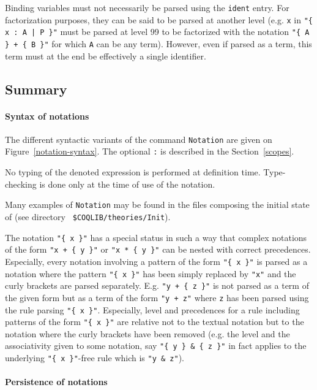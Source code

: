 \Rem Binding variables must not necessarily be parsed using the
{\tt ident} entry. For factorization purposes, they can be said to be
parsed at another level (e.g. {\tt x} in \verb="{ x : A | P }"= must be
parsed at level 99 to be factorized with the notation
\verb="{ A } + { B }"= for which {\tt A} can be any term).  
However, even if parsed as a term, this term must at the end be effectively 
a single identifier.

\subsection{Summary}

\paragraph{Syntax of notations}

The different syntactic variants of the command \texttt{Notation} are
given on Figure~\ref{notation-syntax}. The optional {\tt :{\scope}} is
described in the Section~\ref{scopes}.

\Rem No typing of the denoted expression is performed at definition
time. Type-checking is done only at the time of use of the notation.

\Rem Many examples of {\tt Notation} may be found in the files
composing the initial state of {\Coq} (see directory {\tt
\$COQLIB/theories/Init}).

\Rem The notation \verb="{ x }"= has a special status in such a way
that complex notations of the form \verb="x + { y }"= or
\verb="x * { y }"= can be nested with correct precedences. Especially,
every notation involving a pattern of the form \verb="{ x }"= is
parsed as a notation where the pattern \verb="{ x }"= has been simply
replaced by \verb="x"= and the curly brackets are parsed separately.
E.g. \verb="y + { z }"= is not parsed as a term of the given form but
as a term of the form \verb="y + z"= where \verb=z= has been parsed
using the rule parsing \verb="{ x }"=. Especially, level and
precedences for a rule including patterns of the form \verb="{ x }"=
are relative not to the textual notation but to the notation where the
curly brackets have been removed (e.g. the level and the associativity
given to some notation, say \verb="{ y } & { z }"= in fact applies to
the underlying \verb="{ x }"=-free rule which is \verb="y & z"=).

\paragraph{Persistence of notations}

